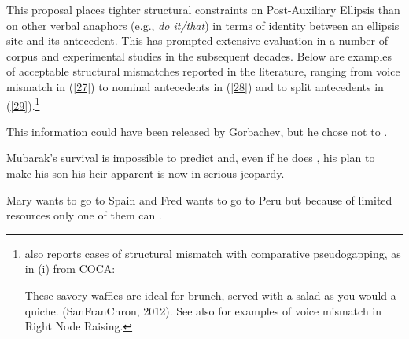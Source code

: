 \eal
{}
\zl
This proposal places tighter structural constraints on Post-Auxiliary Ellipsis than on other verbal anaphors (e.g., \textit{do it/that}) in terms of identity between an ellipsis site and its antecedent. This has prompted extensive evaluation in a number of corpus and experimental studies in the subsequent decades. Below are examples of acceptable structural mismatches reported in the literature, ranging from voice mismatch in (\ref{27}) to nominal antecedents in (\ref{28}) and to split antecedents in (\ref{29}).\footnote{\citet[87]{Miller2014} also reports cases of structural mismatch with  comparative pseudogapping, as in (i) from COCA:

\ea These savory waffles are ideal for brunch, served with a salad as you would a quiche. (SanFranChron, 2012).\z
%
See also \citet{Abeille2016} for examples of voice mismatch in  Right Node Raising. 
}

\ealnoraggedright

\ex This information could have been released by Gorbachev, but he chose not to \jbtr. \citep[37]{Hardt1993} \label{27}

\ex Mubarak's survival is impossible to predict and, even if he does \jbtr, his plan to make his son his heir apparent is now in serious jeopardy. \citep[7]{Miller2014a} \label{28}

\ex Mary wants to go to Spain and Fred wants to go to Peru but because of limited resources only one of them can \jbtr. \citep[128]{Webber79a} \label{29}
\zl

